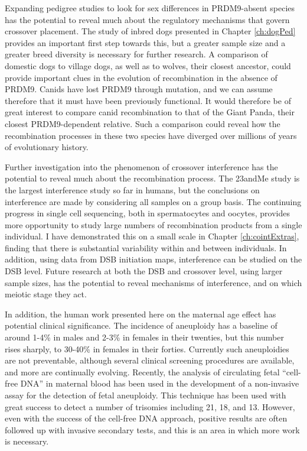 Expanding pedigree studies to look for sex differences in PRDM9-absent species has the potential to reveal much about the regulatory mechanisms that govern crossover placement.
The study of inbred dogs presented in Chapter \ref{ch:dogPed} provides an important first step towards this, but a greater sample size and a greater breed diversity is necessary for further research.
A comparison of domestic dogs to village dogs, as well as to wolves, their closest ancestor, could provide important clues in the evolution of recombination in the absence of PRDM9.
Canids have lost PRDM9 through mutation, and we can assume therefore that it must have been previously functional.
It would therefore be of great interest to compare canid recombination to that of the Giant Panda, their closest PRDM9-dependent relative.
Such a comparison could reveal how the recombination processes in these two species have diverged over millions of years of evolutionary history.

Further investigation into the phenomenon of crossover interference has the potential to reveal much about the recombination process.
The 23andMe study is the largest interference study so far in humans, but the conclusions on interference are made by considering all samples on a group basis.
The continuing progress in single cell sequencing, both in spermatocytes and oocytes, provides more opportunity to study large numbers of recombination products from a single individual.
I have demonstrated this on a small scale in Chapter \ref{ch:cointExtras}, finding that there is substantial variability within and between individuals.
In addition, using data from DSB initiation maps\cite{Pratto2014}, interference can be studied on the DSB level.
Future research at both the DSB and crossover level, using larger sample sizes, has the potential to reveal mechanisms of interference, and on which meiotic stage they act.

In addition, the human work presented here on the maternal age effect has potential clinical significance.
The incidence of aneuploidy has a baseline of around 1-4\% in males and 2-3\% in females in their twenties, but this number rises sharply, to 30-40\% in females in their forties\cite{Hassold2009,Nagaoka2012}.
Currently such aneuploidies are not preventable, although several clinical screening procedures are available, and more are continually evolving.
Recently, the analysis of circulating fetal ``cell-free DNA'' in maternal blood has been used in the development of a non-invasive assay for the detection of fetal aneuploidy\cite{Lo2007}.
This technique has been used with great success to detect a number of trisomies including 21\cite{Papageorgiou2011}, 18\cite{Palomaki2012}, and 13\cite{Palomaki2012}.
However, even with the success of the cell-free DNA approach, positive results are often followed up with invasive secondary tests, and this is an area in which more work is necessary.

